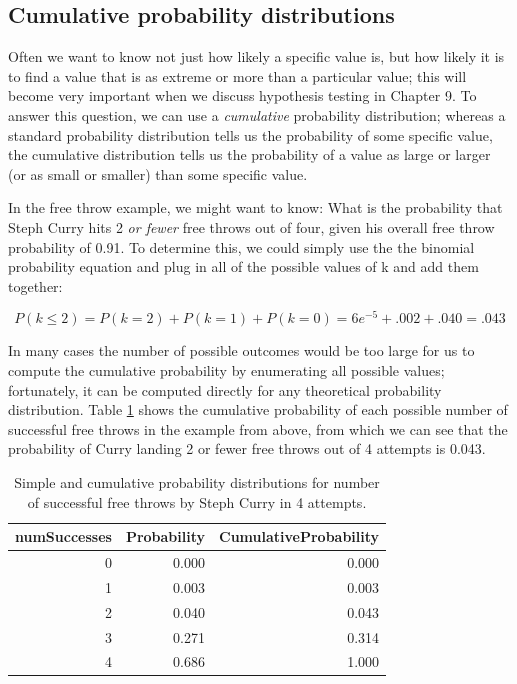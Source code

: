 \documentclass[
  12pt,
]{book}
\begin{document}
\hypertarget{cumulative-probability-distributions}{%
\subsection{Cumulative probability distributions}\label{cumulative-probability-distributions}}

Often we want to know not just how likely a specific value is, but how likely it is to find a value that is as extreme or more than a particular value; this will become very important when we discuss hypothesis testing in Chapter 9. To answer this question, we can use a \emph{cumulative} probability distribution; whereas a standard probability distribution tells us the probability of some specific value, the cumulative distribution tells us the probability of a value as large or larger (or as small or smaller) than some specific value.

In the free throw example, we might want to know: What is the probability that Steph Curry hits 2 \emph{or fewer} free throws out of four, given his overall free throw probability of 0.91. To determine this, we could simply use the the binomial probability equation and plug in all of the possible values of k and add them together:

\[
P(k\le2)= P(k=2) + P(k=1) + P(k=0) = 6e^{-5} + .002 + .040 = .043  
\]

In many cases the number of possible outcomes would be too large for us to compute the cumulative probability by enumerating all possible values; fortunately, it can be computed directly for any theoretical probability distribution. Table \ref{tab:freethrow} shows the cumulative probability of each possible number of successful free throws in the example from above, from which we can see that the probability of Curry landing 2 or fewer free throws out of 4 attempts is 0.043.

\begin{table}

\caption{\label{tab:freethrow}Simple and cumulative probability distributions for number of successful free throws by Steph Curry in 4 attempts.}
\centering
\begin{tabular}[t]{r|r|r}
\hline
numSuccesses & Probability & CumulativeProbability\\
\hline
0 & 0.000 & 0.000\\
\hline
1 & 0.003 & 0.003\\
\hline
2 & 0.040 & 0.043\\
\hline
3 & 0.271 & 0.314\\
\hline
4 & 0.686 & 1.000\\
\hline
\end{tabular}
\end{table}
\end{document}
